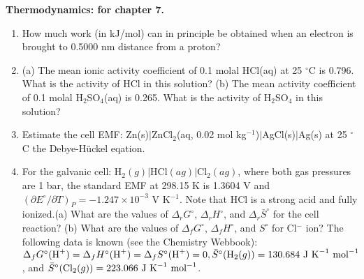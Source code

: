 \noindent
\textbf{Thermodynamics:
 for chapter 7.}\\

\begin{enumerate}

\item How much work (in kJ/mol) can in principle be obtained when an electron is brought to 0.5000 nm distance from a proton?\\


\item (a) The mean ionic activity coefficient of 0.1 molal HCl(aq) at 25 $^\circ$C is 0.796. What is the activity of HCl in this solution? (b) The mean activity coefficient of 0.1 molal H$_2$SO$_4$(aq) is 0.265. What is the activity of H$_2$SO$_4$ in this solution?\\


\item Estimate the cell EMF: Zn(s)$\vert$ZnCl$_2$(aq, 0.02 mol kg$^{-1}$)$\vert$AgCl(s)$\vert$Ag(s) at 25 $^\circ$C the Debye-H\"uckel eqation.\\


\item For the galvanic cell: H$_2(g)\vert$HCl$(ag)\vert$Cl$_2(ag)$, where both gas pressures are 1 bar, the standard EMF at 298.15 K is 1.3604 V and $\left(\partial E^\circ / \partial T\right)_P = -1.247\times 10^{-3}$ V K$^{-1}$. Note that HCl is a strong acid and fully ionized.(a) What are the values of $\Delta_rG^\circ$, $\Delta_rH^\circ$, and $\Delta_r\bar{S}^\circ$ for the cell reaction? (b) What are the values of $\Delta_fG^\circ$, $\Delta_fH^\circ$, and $S^\circ$ for Cl$^-$ ion? The following data is known (see the Chemistry Webbook): $\Delta_fG^\circ(\textnormal{H}^+) = \Delta_fH^\circ(\textnormal{H}^+) = \Delta_fS^\circ(\textnormal{H}^+) = 0, \bar{S}^\circ(\textnormal{H}_2(g)) = 130.684\textnormal{ J K}^{-1}\textnormal{ mol}^{-1}$, and $\bar{S}^\circ(\textnormal{Cl}_2(g)) = 223.066\textnormal{ J K}^{-1}\textnormal{ mol}^{-1}$.\\


\end{enumerate}
